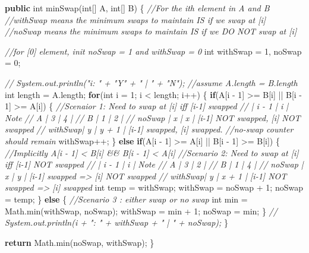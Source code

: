 \documentclass[]{book}
\newenvironment{Shaded}{\begin{snugshade}}{\end{snugshade}}
\newcommand{\BuiltInTok}[1]{#1}
\newcommand{\CommentTok}[1]{\textcolor[rgb]{0.56,0.35,0.01}{\textit{#1}}}
\newcommand{\DataTypeTok}[1]{\textcolor[rgb]{0.13,0.29,0.53}{#1}}
\newcommand{\DecValTok}[1]{\textcolor[rgb]{0.00,0.00,0.81}{#1}}
\newcommand{\FunctionTok}[1]{\textcolor[rgb]{0.00,0.00,0.00}{#1}}
\newcommand{\KeywordTok}[1]{\textcolor[rgb]{0.13,0.29,0.53}{\textbf{#1}}}
\newcommand{\NormalTok}[1]{#1}
\begin{document}
\begin{Shaded}
\begin{Highlighting}[]
\KeywordTok{public} \DataTypeTok{int} \FunctionTok{minSwap}\NormalTok{(}\DataTypeTok{int}\NormalTok{[] A, }\DataTypeTok{int}\NormalTok{[] B) \{}
    \CommentTok{//For the ith element in A and B}
    \CommentTok{//withSwap means the minimum swaps to maintain IS if we swap at [i]}
    \CommentTok{//noSwap means the minimum swaps to maintain IS if we DO NOT swap at [i]}

    \CommentTok{//for [0] element, init noSwap = 1 and withSwap = 0}
    \DataTypeTok{int}\NormalTok{ withSwap = }\DecValTok{1}\NormalTok{, noSwap = }\DecValTok{0}\NormalTok{;}

    \CommentTok{// System.out.println("i:  " + "Y" + " | " + "N");}
    \CommentTok{//assume A.length = B.length}
    \DataTypeTok{int}\NormalTok{ length = A.}\FunctionTok{length}\NormalTok{;}
    \KeywordTok{for}\NormalTok{(}\DataTypeTok{int}\NormalTok{ i = }\DecValTok{1}\NormalTok{; i < length; i++) \{}
        \KeywordTok{if}\NormalTok{(A[i - }\DecValTok{1}\NormalTok{] >= B[i] || B[i - }\DecValTok{1}\NormalTok{] >= A[i]) \{}
            \CommentTok{//Scenaior 1: Need to swap at [i] iff [i-1] swapped}
            \CommentTok{//         | i - 1 | i     | Note}
            \CommentTok{// A       | 3     | 4     |}
            \CommentTok{// B       | 1     | 2     |}
            \CommentTok{// noSwap  | x     | x     | [i-1] NOT swapped, [i] NOT swapped}
            \CommentTok{// withSwap| y     | y + 1 | [i-1] swapped, [i] swapped.}
            \CommentTok{//no-swap counter should remain}
\NormalTok{            withSwap++;}
\NormalTok{        \} }\KeywordTok{else} \KeywordTok{if}\NormalTok{(A[i - }\DecValTok{1}\NormalTok{] >= A[i] || B[i - }\DecValTok{1}\NormalTok{] >= B[i]) \{}
            \CommentTok{//Implicitly A[i - 1] < B[i] && B[i - 1] < A[i]}
            \CommentTok{//Scenario 2: Need to swap at [i] iff [i-1] NOT swapped}
            \CommentTok{//         | i - 1 | i     | Note}
            \CommentTok{// A       | 3     | 2     |}
            \CommentTok{// B       | 1     | 4     |}
            \CommentTok{// noSwap  | x     | y     | [i-1] swapped => [i] NOT swapped}
            \CommentTok{// withSwap| y     | x + 1 | [i-1] NOT swapped => [i] swapped}
            \DataTypeTok{int}\NormalTok{ temp = withSwap;}
\NormalTok{            withSwap = noSwap + }\DecValTok{1}\NormalTok{;}
\NormalTok{            noSwap = temp;}
\NormalTok{        \} }\KeywordTok{else}\NormalTok{ \{}
            \CommentTok{//Scenario 3 : either swap or no swap}
            \DataTypeTok{int}\NormalTok{ min = }\BuiltInTok{Math}\NormalTok{.}\FunctionTok{min}\NormalTok{(withSwap, noSwap);}
\NormalTok{            withSwap = min + }\DecValTok{1}\NormalTok{;}
\NormalTok{            noSwap = min;}
\NormalTok{        \}}
        \CommentTok{// System.out.println(i + ": " + withSwap + " | " + noSwap);}
\NormalTok{    \}}

    \KeywordTok{return} \BuiltInTok{Math}\NormalTok{.}\FunctionTok{min}\NormalTok{(noSwap, withSwap);}
\NormalTok{\}}
\end{Highlighting}
\end{Shaded}
\end{document}
